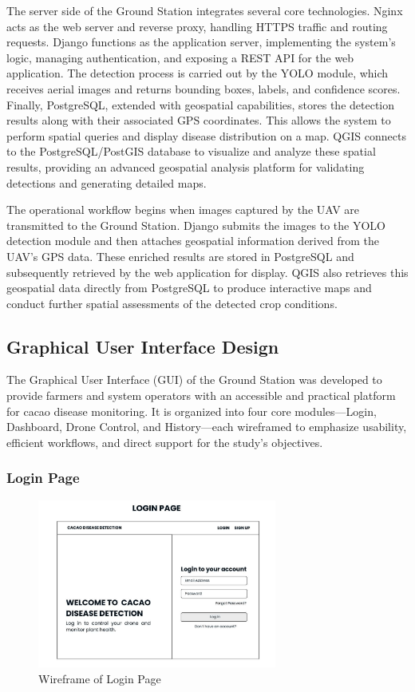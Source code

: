The server side of the Ground Station integrates several core technologies. Nginx acts as the web server and reverse proxy, handling HTTPS traffic and routing requests. Django functions as the application server, implementing the system’s logic, managing authentication, and exposing a REST API for the web application. The detection process is carried out by the YOLO module, which receives aerial images and returns bounding boxes, labels, and confidence scores. Finally, PostgreSQL, extended with geospatial capabilities, stores the detection results along with their associated GPS coordinates. This allows the system to perform spatial queries and display disease distribution on a map. QGIS connects to the PostgreSQL/PostGIS database to visualize and analyze these spatial results, providing an advanced geospatial analysis platform for validating detections and generating detailed maps.

The operational workflow begins when images captured by the UAV are transmitted to the Ground Station. Django submits the images to the YOLO detection module and then attaches geospatial information derived from the UAV’s GPS data. These enriched results are stored in PostgreSQL and subsequently retrieved by the web application for display. QGIS also retrieves this geospatial data directly from PostgreSQL to produce interactive maps and conduct further spatial assessments of the detected crop conditions.

\subsection{Graphical User Interface Design}

The Graphical User Interface (GUI) of the Ground Station was developed to provide farmers and system operators with an accessible and practical platform for cacao disease monitoring. It is organized into four core modules—Login, Dashboard, Drone Control, and History—each wireframed to emphasize usability, efficient workflows, and direct support for the study’s objectives.

\subsubsection*{Login Page}

\begin{figure}[H]
	\centering
	\caption{Wireframe of Login Page}
	\label{fig:LoginGUI}
	\includegraphics[width=0.7\textwidth]{figures/Login.pdf}
\end{figure}

